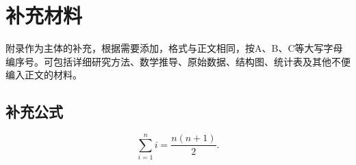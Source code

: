 \chapter{补充材料}
附录作为主体的补充，根据需要添加，格式与正文相同，按A、B、C等大写字母编序号。可包括详细研究方法、数学推导、原始数据、结构图、统计表及其他不便编入正文的材料。
\section{补充公式}
\begin{equation}
  \sum_{i=1}^{n}i=\frac{n(n+1)}{2}.
\end{equation}
